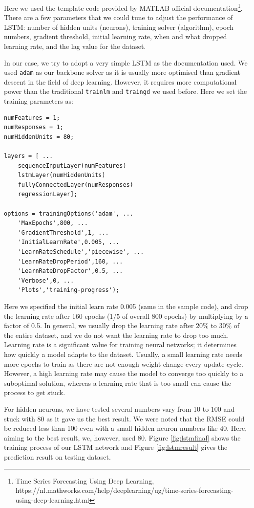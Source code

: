 \documentclass{article}
\begin{document}
Here we used the template code provided by MATLAB official documentation\footnote{Time Series Forecasting Using Deep Learning, https://nl.mathworks.com/help/deeplearning/ug/time-series-forecasting-using-deep-learning.html}. There are a few parameters that we could tune to adjust the performance of LSTM: number of hidden units (neurons), training solver (algorithm), epoch numbers, gradient threshold, initial learning rate, when and what dropped learning rate, and the lag value for the dataset. 

In our case, we try to adopt a very simple LSTM as the documentation used. We used \verb|adam| as our backbone solver as it is usually more optimised than gradient descent in the field of deep learning. However, it requires more computational power than the traditional \verb|trainlm| and \verb|traingd| we used before. Here we set the training parameters as:

\begin{verbatim}
numFeatures = 1;
numResponses = 1;
numHiddenUnits = 80;

layers = [ ...
    sequenceInputLayer(numFeatures)
    lstmLayer(numHiddenUnits)
    fullyConnectedLayer(numResponses)
    regressionLayer];

options = trainingOptions('adam', ...
    'MaxEpochs',800, ...
    'GradientThreshold',1, ...
    'InitialLearnRate',0.005, ...
    'LearnRateSchedule','piecewise', ...
    'LearnRateDropPeriod',160, ...
    'LearnRateDropFactor',0.5, ...
    'Verbose',0, ...
    'Plots','training-progress');
\end{verbatim}

Here we specified the initial learn rate 0.005 (same in the sample code), and drop the learning rate after 160 epochs (1/5 of overall 800 epochs) by multiplying by a factor of 0.5. In general, we usually drop the learning rate after 20\% to 30\% of the entire dataset, and we do not want the learning rate to drop too much. Learning rate is a significant value for training neural networks; it determines how quickly a model adapts to the dataset. Usually, a small learning rate needs more epochs to train as there are not enough weight change every update cycle. However, a high learning rate may cause the model to converge too quickly to a suboptimal solution, whereas a learning rate that is too small can cause the process to get stuck.

For hidden neurons, we have tested several numbers vary from 10 to 100 and stuck with 80 as it gave us the best result. We were noted that the RMSE could be reduced less than 100 even with a small hidden neuron numbers like 40. Here, aiming to the best result, we, however, used 80. Figure \ref{fig:lstmfinal} shows the training process of our LSTM network and Figure \ref{fig:lstmresult} gives the prediction result on testing dataset.
\end{document}
